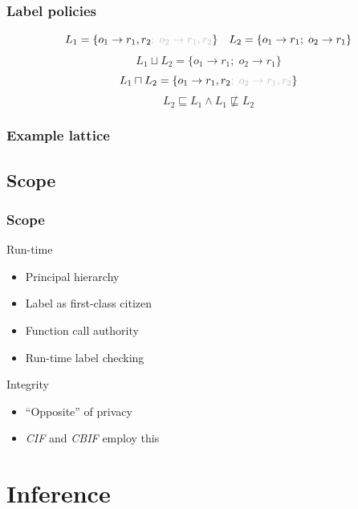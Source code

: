 \documentclass[10pt]{beamer}
\newcommand{\ipol}[1]{\textcolor{lightgray}{#1}}
\begin{document}
\begin{frame}
  \frametitle{Label policies}
  \centering

  \newcommand{\mathvspace}{\\[2em]}
    \[ L_1 = \{ o_1 \rightarrow r_1, r_2 \ipol{; \; o_2 \rightarrow r_1, r_2} \} \quad L_2 = \{ o_1 \rightarrow r_1 ; \; o_2 \rightarrow r_1 \} \]
    \[ L_1 \sqcup L_2  = \{ o_1 \rightarrow r_1 ; \; o_2 \rightarrow r_1 \} \]
    \[ L_1 \sqcap L_2  = \{ o_1 \rightarrow r_1, r_2 \ipol{; \; o_2 \rightarrow r_1, r_2 } \} \]
    \[ L_2 \sqsubseteq L_1 \land L_1 \not\sqsubseteq L_2 \]
  \end{frame}

\begin{frame}
  \frametitle{Example lattice}
  \scalebox{0.5}{}
\end{frame}

\subsection{Scope}
\begin{frame}
  \frametitle{Scope}

  Run-time
  \begin{itemize}
    \item Principal hierarchy
    \item Label as first-class citizen
    \item Function call authority
    \item Run-time label checking
  \end{itemize}
  \vspace{1em}
  Integrity
  \begin{itemize}
    \item ``Opposite'' of privacy
    \item \emph{CIF} and \emph{CBIF} employ this
  \end{itemize}
\end{frame}

\section{Inference}
\end{document}
